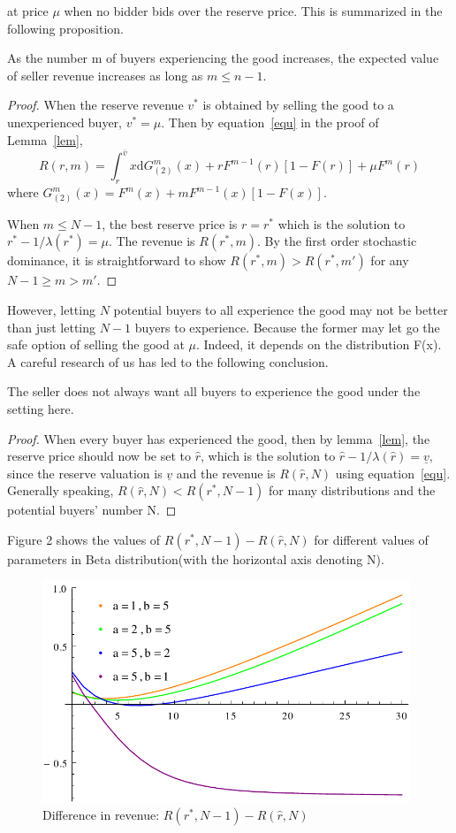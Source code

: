 at price $\mu$ when no bidder bids over the
reserve price. This is summarized in the following proposition. 
\begin{prop}
 As the number m of buyers experiencing the good increases, the expected value of seller revenue increases as long as $m\leq n-1$. 
\end{prop}
\begin{proof}
When the reserve revenue $v^*$ is obtained by selling the good to a 
unexperienced buyer, $v^*=\mu$. Then by equation~\ref{equ} in the proof of Lemma~\ref{lem}, 
\begin{equation}
R(r, m) = \int_{r}^{\overline{v}}x\mathrm{d}G_{(2)}^{m}(x) +
rF^{m-1}(r)[1 - F(r)] + \mu F^{m}(r)
\end{equation}
where $G_{(2)}^{m}(x) = F^{m}(x) + mF^{m-1}(x)[1 - F(x)]$. 

When $m\leq N-1$, the best reserve price is $r=r^*$ which is the solution to $r^*-1/\lambda(r^*)=\mu$. The revenue is $R(r^*, m)$. 
 By the first order stochastic dominance, it is straightforward to show $R(r^*, m) > R(r^*, m')$ for any $N-1\geq m>m'$. 
\end{proof}
However, letting $N$ potential buyers to all experience the good may
not be better than just letting $N-1$ buyers to experience. Because the former may let go the
safe option of selling the good at $\mu$. Indeed, it depends on the
distribution F(x). A careful research of us has led to the following conclusion. 
\begin{thm}
 The seller does not always want all buyers to experience the good under the setting here. 
 \end{thm}
 \begin{proof}
 When every buyer has experienced the good, then by lemma~\ref{lem}, 
 the reserve price should now be set to $\hat{r}$, which is the solution to $\hat{r}-1/\lambda(\hat{r})=\underline{v}$, since the reserve
valuation is $\underline{v}$ and the revenue 
is $R(\hat{r}, N)$ using equation~\ref{equ}. 
Generally speaking, 
 $R(\hat{r}, N)<R(r^*, N-1)$ for many distributions and the potential buyers' number N. 
 \end{proof}
Figure 2 shows the values of $R(r^*, N-1)-R(\hat{r}, N)$ for different
values of parameters in Beta distribution(with the horizontal axis denoting N). 
\begin{figure}
\centering
\includegraphics[width = 11cm]{betaGraph.pdf}
\caption{Difference in revenue: $R(r^*, N-1)-R(\hat{r}, N)$} \label{fig:graph}
\end{figure}

